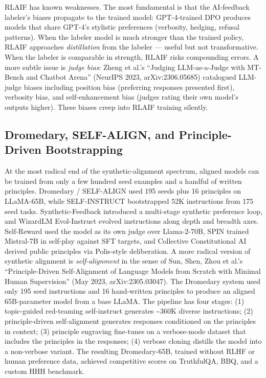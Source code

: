 \documentclass{article}
\begin{document}
RLAIF has known weaknesses. The most fundamental is that the AI-feedback labeler's biases propagate to the trained model: GPT-4-trained DPO produces models that share GPT-4's stylistic preferences (verbosity, hedging, refusal patterns). When the labeler model is much stronger than the trained policy, RLAIF approaches \emph{distillation} from the labeler --- useful but not transformative. When the labeler is comparable in strength, RLAIF risks compounding errors. A more subtle issue is \emph{judge bias}: Zheng et al.'s ``Judging LLM-as-a-Judge with MT-Bench and Chatbot Arena'' (NeurIPS 2023, arXiv:2306.05685) catalogued LLM-judge biases including position bias (preferring responses presented first), verbosity bias, and self-enhancement bias (judges rating their own model's outputs higher). These biases creep into RLAIF training silently.

\subsection{Dromedary, SELF-ALIGN, and Principle-Driven Bootstrapping}\label{dromedary-self-align-and-principle-driven-bootstrapping}

At the most radical end of the synthetic-alignment spectrum, aligned models can be trained from only a few hundred seed examples and a handful of written principles. Dromedary / SELF-ALIGN \citep{sun2023principledrivensel} used 195 seeds plus 16 principles on LLaMA-65B, while SELF-INSTRUCT \citep{wang2023aligninglargelangu} bootstrapped 52K instructions from 175 seed tasks. Synthetic-Feedback \citep{kim2023aligninglargelangu} introduced a multi-stage synthetic preference loop, and WizardLM Evol-Instruct \citep{xu2023wizardlmempowering} evolved instructions along depth and breadth axes. Self-Reward \citep{yuan2023rrhfrankresponsest} used the model as its own judge over Llama-2-70B, SPIN \citep{chen20252025} trained Mistral-7B in self-play against SFT targets, and Collective Constitutional AI \citep{huang2024collectiveconstitu} derived public principles via Polis-style deliberation. A more radical version of synthetic alignment is \emph{self-alignment} in the sense of Sun, Shen, Zhou et al.'s ``Principle-Driven Self-Alignment of Language Models from Scratch with Minimal Human Supervision'' (May 2023, arXiv:2305.03047). The Dromedary system used only 195 seed instructions and 16 hand-written principles to produce an aligned 65B-parameter model from a base LLaMA. The pipeline has four stages: (1) topic-guided red-teaming self-instruct generates \textasciitilde360K diverse instructions; (2) principle-driven self-alignment generates responses conditioned on the principles in context; (3) principle engraving fine-tunes on a verbose-mode dataset that includes the principles in the responses; (4) verbose cloning distills the model into a non-verbose variant. The resulting Dromedary-65B, trained without RLHF or human preference data, achieved competitive scores on TruthfulQA, BBQ, and a custom HHH benchmark.
\end{document}
